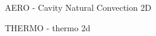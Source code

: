 \begin{frame}[fragile]{ AERO - Cavity Natural Convection 2D}

\end{frame}

\begin{frame}[fragile]{ THERMO - thermo 2d}

\end{frame}

%
%
%


